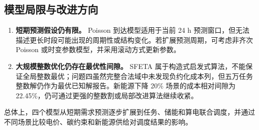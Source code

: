\subsection{模型局限与改进方向}

\begin{enumerate}
    \item \textbf{短期预测假设仍有限。} Poisson 到达模型适用于当前 24 h 预测窗口，但无法描述更长时段可能出现的周期性或结构变化。若扩展预测周期，可考虑非齐次 Poisson 或时变参数模型，并采用滚动方式更新参数。

    \item \textbf{大规模整数优化仍存在最优性间隙。} SFETA 属于构造式启发式算法，不能保证全局整数最优；问题四虽然完整合法域中未发现负约化成本列，但五万任务整数解仍作为最优已知解报告。新能源下降 20\% 场景的成本相对间隙为 22.45\%，仍可通过更强的整数割或局部改进算法继续收紧。
\end{enumerate}

总体上，四个模型从短期需求预测逐步扩展到任务、储能和算电联合调度，并通过不同场景比较电价、碳约束和新能源供给对调度结果的影响。

